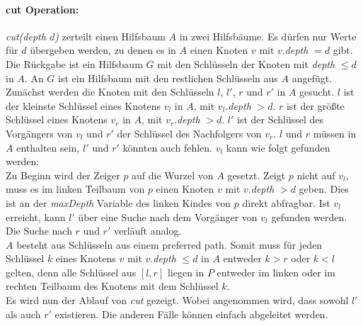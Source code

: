 \documentclass[a4paper,12pt]{article}
\begin{document}
\paragraph{cut Operation:} \label{cut}

\noindent \textit{cut(depth $d$)} zerteilt einen Hilfsbaum $A$ in zwei Hilfsbäume. Es dürfen nur Werte für $d$ übergeben werden, zu denen es in $A$ einen Knoten $v$ mit $v.$\textit{depth} $ = d $ gibt. Die Rückgabe ist ein Hilfsbaum $G$ mit den Schlüsseln der Knoten mit \textit{depth} $\leq d$ in $A$. An $G$ ist ein Hilfsbaum mit den restlichen Schlüsseln aus $A$ angefügt. Zunächst werden die Knoten mit den Schlüsseln $l$,  $l'$, $r$ und $r'$ in $A$ gesucht. $l$ ist der kleinste Schlüssel eines Knotens $v_l$ in $A$, mit $v_l$.\textit{depth} $> d$. $r$ ist der größte Schlüssel eines Knotens $v_r$ in $A$, mit $v_r$.\textit{depth} $> d$. $l'$ ist der Schlüssel des Vorgängers von $v_l$ und $r'$ der Schlüssel des Nachfolgers von $v_r$. $l$ und $r$ müssen in $A$ enthalten sein, $l'$ und $r'$ könnten auch fehlen. $v_l$ kann wie folgt gefunden werden:\\ Zu Beginn wird der Zeiger $p$ auf die Wurzel von $A$ gesetzt. Zeigt $p$ nicht auf $v_l$, muss es im linken Teilbaum von $p$ einen Knoten $v$ mit $v$.\textit{depth} $> d$ geben. Dies ist an der \textit{maxDepth} Variable des linken Kindes von $p$ direkt abfragbar. Ist $v_l$ erreicht, kann $l'$ über eine Suche nach dem Vorgänger von $v_l$ gefunden werden. Die Suche nach $r$ und $r'$ verläuft analog. \\
$A$ besteht aus Schlüsseln aus einem preferred path. Somit muss für jeden Schlüssel $k$ eines Knotens $v$ mit $v$.\textit{depth} $\leq d$ in $A$ entweder $k > r$ oder $k < l$ gelten, denn alle Schlüssel aus $\left[l,r\right]$ liegen in $P$ entweder im linken oder im rechten Teilbaum des Knotens mit dem Schlüssel $k$. \\
Es wird nun der Ablauf von \textit{cut} gezeigt. Wobei angenommen wird, dass sowohl $l'$ als auch $r'$ existieren. Die anderen Fälle können einfach abgeleitet werden.
\end{document}
